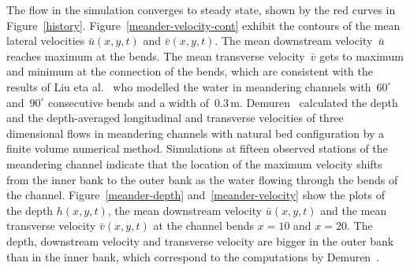\documentclass[a5paper,12pt]{article}
\newcommand{\uu}{{\bar u}}
\newcommand{\vv}{{\bar v}}
\begin{document}
The flow in the simulation converges to steady state, shown by the red curves in Figure~\ref{history}.
Figure~\ref{meander-velocity-cont} exhibit the contours of the mean lateral velocities $\uu(x,y,t)$ and $\vv(x,y,t)$. 
The mean downstream velocity~$\uu$ reaches maximum at the bends.
The mean transverse velocity~$\vv$ gets to maximum and minimum at the connection of the bends, which are consistent with the results of Liu eta al.~\cite{Liu2009} who modelled the water in meandering channels with~$60^\circ$ and~$90^\circ$ consecutive bends and a width of~$0.3$\,m.
Demuren~\cite{Demuren1993} calculated the depth and the depth-averaged longitudinal and transverse velocities of three dimensional flows in meandering channels with natural bed configuration by a finite volume numerical method. 
Simulations at fifteen observed stations of the meandering channel indicate that the location of the maximum velocity shifts from the inner bank to the outer bank as the water flowing through the bends of the channel. 
Figure~\ref{meander-depth} and~\ref{meander-velocity} show the plots of the depth $h(x,y,t)$, the mean downstream velocity $\uu(x,y,t)$ and the mean transverse velocity $\vv(x,y,t)$ at the channel bends $x=10$ and $x=20$.
The depth, downstream velocity and transverse velocity are bigger in the outer bank than in the inner bank, which correspond to the computations by Demuren~\cite{Demuren1993}. 
\end{document}
